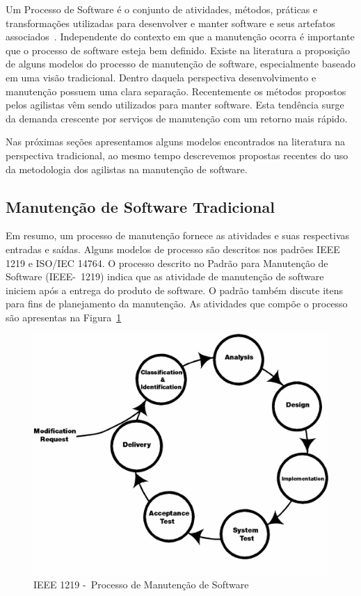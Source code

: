 Um Processo de Software é o conjunto de atividades, métodos, práticas e
transformações utilizadas para desenvolver e manter software e seus artefatos
associados~\cite{paulk1993key}.  Independente do contexto em que a manutenção
ocorra é importante que o processo de software esteja bem definido. Existe na
literatura a proposição de alguns modelos do processo de manutenção de software,
especialmente baseado em uma visão tradicional. Dentro daquela perspectiva
desenvolvimento e manutenção possuem uma clara separação. Recentemente os
métodos propostos pelos agilistas vêm sendo utilizados para manter software.
Esta tendência surge da demanda crescente por serviços de manutenção com um
retorno mais rápido. 

Nas próximas seções apresentamos alguns modelos encontrados na literatura na
perspectiva tradicional, ao mesmo tempo descrevemos propostas recentes do uso da
metodologia dos agilistas na manutenção de software. 

\subsection{Manutenção de Software Tradicional}
\label{subsec:manutenção_de_software_tradicional}

Em resumo, um processo de manutenção fornece as atividades e suas respectivas
entradas e saídas.  Alguns modelos de processo são descritos nos padrões IEEE
1219 e ISO/IEC 14764. O processo descrito no Padrão para Manutenção de Software
(IEEE-~1219) indica que as atividade de manutenção de software iniciem após a
entrega do produto de software. O padrão também discute itens para fins de
planejamento da manutenção. As atividades que compõe o processo são apresentas
na Figura~\ref{fig:ieee-1219-processo-man-software}

\begin{figure}[htpb]
	\centering
	\includegraphics[width=0.8\linewidth]{chapter-manutencao-software-visao-geral/img/ieee-1219-98-processo-manutencao.png}
	\caption{IEEE 1219 -~Processo de Manutenção de Software}
	\label{fig:ieee-1219-processo-man-software}
\end{figure}

